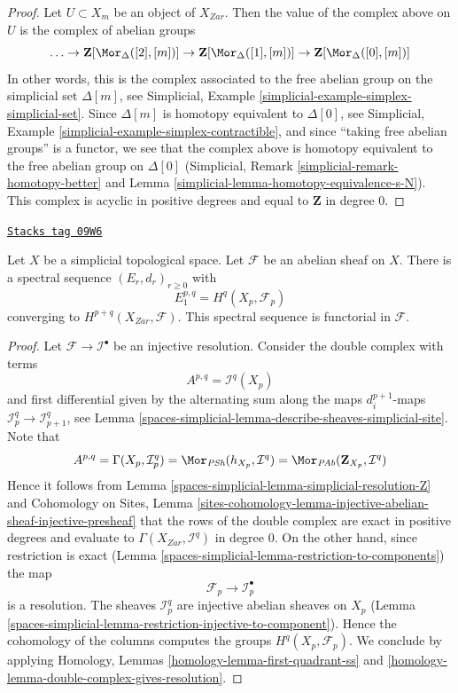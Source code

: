 \begin{proof}
Let $U \subset X_m$ be an object of $X_{Zar}$. Then the value of
the complex above on $U$ is the complex of abelian groups
$$
\ldots \to
\mathbf{Z}[\Mor_\Delta([2], [m])] \to
\mathbf{Z}[\Mor_\Delta([1], [m])] \to
\mathbf{Z}[\Mor_\Delta([0], [m])]
$$
In other words, this is the complex associated to the
free abelian group on the simplicial set $\Delta[m]$, see
Simplicial, Example \ref{simplicial-example-simplex-simplicial-set}.
Since $\Delta[m]$ is homotopy equivalent to $\Delta[0]$, see
Simplicial, Example \ref{simplicial-example-simplex-contractible},
and since ``taking free abelian groups'' is a functor,
we see that the complex above is homotopy equivalent to
the free abelian group on $\Delta[0]$
(Simplicial, Remark \ref{simplicial-remark-homotopy-better} and
Lemma \ref{simplicial-lemma-homotopy-equivalence-s-N}).
This complex is acyclic in positive degrees
and equal to $\mathbf{Z}$ in degree $0$.
\end{proof}

\begin{lemma}
\label{spaces-simplicial-lemma-simplicial-sheaf-cohomology}
\href{https://stacks.math.columbia.edu/tag/09W6}{\texttt{Stacks tag 09W6}}

Let $X$ be a simplicial topological space. Let $\mathcal{F}$ be an abelian
sheaf on $X$. There is a spectral sequence $(E_r, d_r)_{r \geq 0}$ with
$$
E_1^{p, q} = H^q(X_p, \mathcal{F}_p)
$$
converging to $H^{p + q}(X_{Zar}, \mathcal{F})$.
This spectral sequence is functorial in $\mathcal{F}$.
\end{lemma}

\begin{proof}
Let $\mathcal{F} \to \mathcal{I}^\bullet$ be an injective resolution.
Consider the double complex with terms
$$
A^{p, q} = \mathcal{I}^q(X_p)
$$
and first differential given by the alternating sum along the maps
$d^{p + 1}_i$-maps $\mathcal{I}_p^q \to \mathcal{I}_{p + 1}^q$, see
Lemma \ref{spaces-simplicial-lemma-describe-sheaves-simplicial-site}. Note that
$$
A^{p, q} = \Gamma(X_p, \mathcal{I}_p^q) =
\Mor_{\textit{PSh}}(h_{X_p}, \mathcal{I}^q) =
\Mor_{\textit{PAb}}(\mathbf{Z}_{X_p}, \mathcal{I}^q)
$$
Hence it follows from Lemma \ref{spaces-simplicial-lemma-simplicial-resolution-Z} and
Cohomology on Sites, Lemma
\ref{sites-cohomology-lemma-injective-abelian-sheaf-injective-presheaf}
that the rows of the double complex are exact in positive degrees and
evaluate to $\Gamma(X_{Zar}, \mathcal{I}^q)$ in degree $0$.
On the other hand, since restriction is exact
(Lemma \ref{spaces-simplicial-lemma-restriction-to-components})
the map
$$
\mathcal{F}_p \to \mathcal{I}_p^\bullet
$$
is a resolution. The sheaves $\mathcal{I}_p^q$ are injective
abelian sheaves on $X_p$
(Lemma \ref{spaces-simplicial-lemma-restriction-injective-to-component}).
Hence the cohomology of the columns computes the groups
$H^q(X_p, \mathcal{F}_p)$. We conclude by applying
Homology, Lemmas \ref{homology-lemma-first-quadrant-ss} and
\ref{homology-lemma-double-complex-gives-resolution}.
\end{proof}

